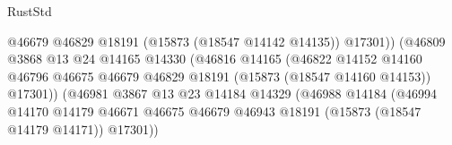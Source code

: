 \begin{lexlean}{RustStd}
\begin{coremodule}
                                                      @46679
                                                      @46829
                                                      @18191
                                                      (@15873 (@18547 @14142 @14135))
                                                      @17301))
                                                  (@46809
                                                    @3868
                                                    @13
                                                    @24
                                                    @14165
                                                    @14330
                                                    (@46816
                                                      @14165
                                                      (@46822
                                                        @14152
                                                        @14160
                                                        @46796
                                                        @46675
                                                        @46679
                                                        @46829
                                                        @18191
                                                        (@15873 (@18547 @14160 @14153))
                                                        @17301))
                                                    (@46981
                                                      @3867
                                                      @13
                                                      @23
                                                      @14184
                                                      @14329
                                                      (@46988
                                                        @14184
                                                        (@46994
                                                          @14170
                                                          @14179
                                                          @46671
                                                          @46675
                                                          @46679
                                                          @46943
                                                          @18191
                                                          (@15873 (@18547 @14179 @14171))
                                                          @17301))

\end{coremodule}
\end{lexlean}
